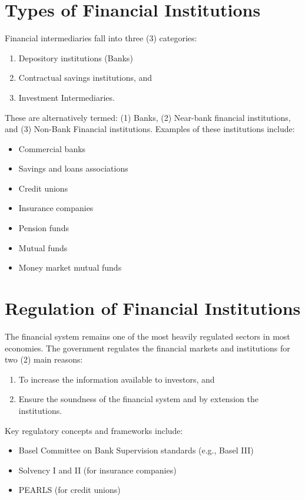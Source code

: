 \section{Types of Financial Institutions}

Financial intermediaries fall into three (3) categories:
\begin{enumerate}
    \item Depository institutions (Banks)
    \item Contractual savings institutions, and
    \item Investment Intermediaries.
\end{enumerate}
These are alternatively termed: (1) Banks, (2) Near-bank financial institutions, and (3) Non-Bank Financial institutions. Examples of these institutions include:
\begin{itemize}
    \item Commercial banks
    \item Savings and loans associations
    \item Credit unions
    \item Insurance companies
    \item Pension funds
    \item Mutual funds
    \item Money market mutual funds
\end{itemize}

\section{Regulation of Financial Institutions}

The financial system remains one of the most heavily regulated sectors in most economies. The government regulates the financial markets and institutions for two (2) main reasons:
\begin{enumerate}
    \item To increase the information available to investors, and
    \item Ensure the soundness of the financial system and by extension the institutions.
\end{enumerate}
Key regulatory concepts and frameworks include:
\begin{itemize}
    \item Basel Committee on Bank Supervision standards (e.g., Basel III)
    \item Solvency I and II (for insurance companies)
    \item PEARLS (for credit unions)
\end{itemize}

